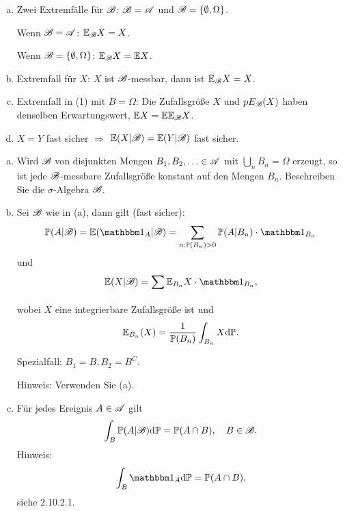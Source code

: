 \begin{rmrk}
  \begin{enumerate}[(a)]
  \item Zwei Extremfälle für $\mathscr{B}$: $\mathscr{B} = \mathscr{A}$ und $\mathscr{B} = \{ \emptyset, \Omega
    \}$.

    Wenn $\mathscr{B} = \mathscr{A}$: $\mathbb{E}_{\mathscr{B}} X = X$.

    Wenn $\mathscr{B} = \{ \emptyset, \Omega \}$: $\mathbb{E}_{\mathscr{B}} X = \mathbb{E} X$.
  \item Extremfall für $X$: $X$ ist $\mathscr{B}$-messbar, dann ist $\mathbb{E}_{\mathscr{B}} X = X$.
  \item Extremfall in (1) mit $B = \Omega$: Die Zufallsgröße $X$ und $pE_{\mathscr{B}}(X)$
    haben denselben Erwartungswert, $\mathbb{E} X = \mathbb{E} \mathbb{E}_{\mathscr{B}} X$.
  \item $X = Y$ fast sicher $\Rightarrow$ $\mathbb{E}(X|\mathscr{B}) = \mathbb{E}(Y|\mathscr{B})$ fast sicher.
  \end{enumerate}
\end{rmrk}

\begin{prgp}[Aufgabe]
  \begin{enumerate}[(a)]
  \item Wird $\mathscr{B}$ von disjunkten Mengen $B_1, B_2, \ldots \in \mathscr{A}$ mit
    $\bigcup_n B_n = \Omega$ erzeugt, so ist jede $\mathscr{B}$-messbare Zufallsgröße
    konstant auf den Mengen $B_n$. Beschreiben Sie die $\sigma$-Algebra $\mathscr{B}$.
  \item Sei $\mathscr{B}$ wie in (a), dann gilt (fast sicher):
    \[ \pP(A|\mB) = \pE( \ind_A | \mB ) = \sum_{n : \pP(B_n) > 0} \pP(A | B_n)
      \cdot \ind_{B_n} \]
    und
    \[ \pE(X|\mB) = \sum_{} \pE_{B_n} X \cdot \ind_{B_n},\]
    wobei $X$ eine integrierbare Zufallsgröße ist und
    \[ \mathbb{E}_{B_n}(X) = \frac{1}{\mathbb{P}(B_n)} \int_{B_n} X \mathrm{d} \mathbb{P}. \]

    Spezialfall: $B_1 = B, B_2 = B^C$.
    
    Hinweis: Verwenden Sie (a).
  \item  Für jedes Ereignis $A \in \mathscr{A}$ gilt
    \[ \int_B \mathbb{P}( A | \mathscr{B} ) \mathrm{d} \mathbb{P} = \mathbb{P}(A \cap B), \quad B \in \mathscr{B}. \]
    Hinweis:
    \[ \int_B \ind_A \diffop \pP = \pP(A \cap B), \]
    siehe 2.10.2.1.
  \end{enumerate}
\end{prgp}

